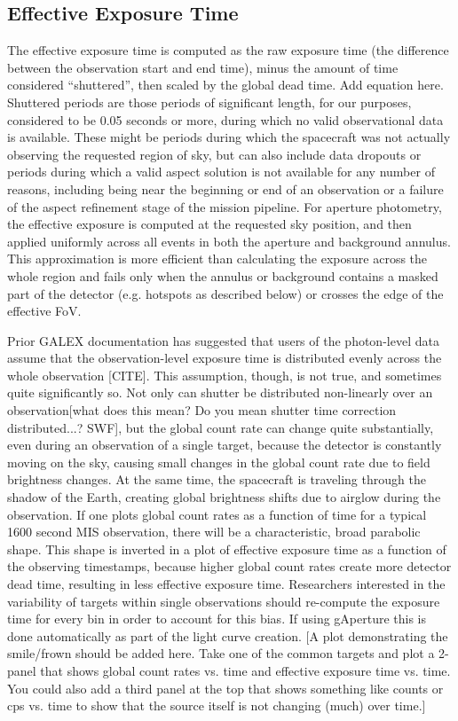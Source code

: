 \documentclass[5p]{elsarticle}
\begin{document}
\subsection{Effective Exposure Time}
\label{effexptime}
The effective exposure time is computed as the raw exposure time (the difference between the observation start and end time), minus the amount of time considered ``shuttered'', then scaled by the global dead time.  {\color{red}Add equation here.} Shuttered periods are those periods of significant length, for our purposes, considered to be 0.05 seconds or more, during which no valid observational data is available. These might be periods during which the spacecraft was not actually observing the requested region of sky, but can also include data dropouts or periods during which a valid aspect solution is not available for any number of reasons, including being near the beginning or end of an observation or a failure of the aspect refinement stage of the mission pipeline.  For aperture photometry, the effective exposure is computed at the requested sky position, and then applied uniformly across all events in both the aperture and background annulus. This approximation is more efficient than calculating the exposure across the whole region and fails only when the annulus or background contains a masked part of the detector (e.g. hotspots as described below) or crosses the edge of the effective FoV.

Prior GALEX documentation has suggested that users of the photon-level data assume that the observation-level exposure time is distributed evenly across the whole observation {\color{red}[CITE]}. This assumption, though, is not true, and sometimes quite significantly so. Not only can shutter be distributed non-linearly over an observation{\color{red}[what does this mean?  Do you mean shutter time correction distributed...? SWF]}, but the global count rate can change quite substantially, even during an observation of a single target, because the detector is constantly moving on the sky, causing small changes in the global count rate due to field brightness changes.  At the same time, the spacecraft is traveling through the shadow of the Earth, creating global brightness shifts due to airglow during the observation. If one plots global count rates as a function of time for a typical 1600 second MIS observation, there will be a characteristic, broad parabolic shape.  This shape is inverted in a plot of effective exposure time as a function of the observing timestamps, because higher global count rates create more detector dead time, resulting in less effective exposure time.  Researchers interested in the variability of targets within single observations should re-compute the exposure time for every bin in order to account for this bias.  If using gAperture this is done automatically as part of the light curve creation.  {\color{red}[A plot demonstrating the smile/frown should be added here.  Take one of the common targets and plot a 2-panel that shows global count rates vs. time and effective exposure time vs. time.  You could also add a third panel at the top that shows something like counts or cps vs. time to show that the source itself is not changing (much) over time.]}
\end{document}

